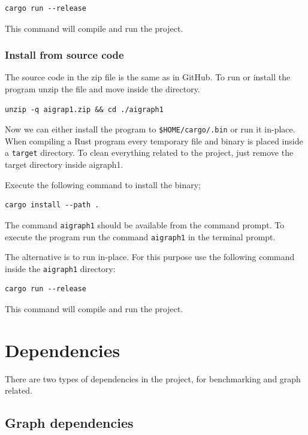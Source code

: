 \begin{verbatim}
cargo run --release
\end{verbatim}

This command will compile and run the project.

\subsubsection{Install from source code}

The source code in the zip file is the same as in GitHub. To run or install the program unzip the file and move inside the
directory.


\begin{verbatim}
unzip -q aigrap1.zip && cd ./aigraph1
\end{verbatim}


Now we can either install the program to \texttt{\$HOME/cargo/.bin} or run it in-place. When compiling a 
Rust program every temporary file and binary is placed inside a \texttt{target} directory. To clean everything
related to the project, just remove the target directory inside aigraph1.

Execute the following command to install the binary;

\begin{verbatim}
cargo install --path .
\end{verbatim}

The command \texttt{aigraph1} should be available from the command prompt.
To execute the program run the command \texttt{aigraph1} in the terminal prompt.

The alternative is to run in-place. For this purpose use the following command inside the \texttt{aigraph1} directory:

\begin{verbatim}
cargo run --release
\end{verbatim}

This command will compile and run the project.


\newpage
\section{Dependencies}

There are two types of dependencies in the project, for benchmarking and graph related.

\subsection{Graph dependencies}

